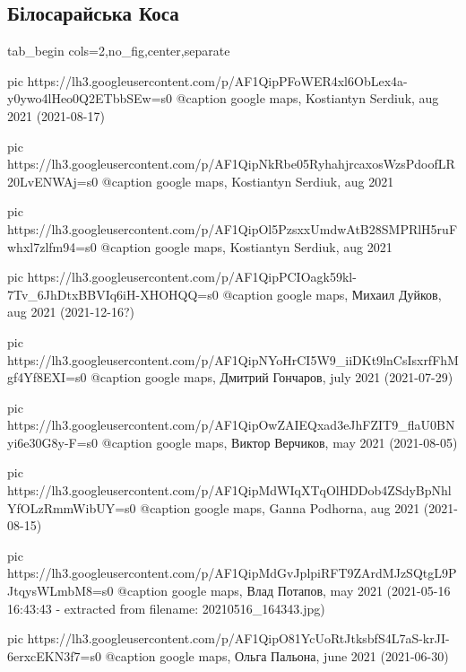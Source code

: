  
 
 
 
 

\subsection{Білосарайська Коса}


\ifcmt
  tab_begin cols=2,no_fig,center,separate

     pic https://lh3.googleusercontent.com/p/AF1QipPFoWER4xl6ObLex4a-y0ywo4lHeo0Q2ETbbSEw=s0
		 @caption google maps, Kostiantyn Serdiuk, aug 2021 (2021-08-17)

		 pic https://lh3.googleusercontent.com/p/AF1QipNkRbe05RyhahjrcaxosWzsPdoofLR20LvENWAj=s0
		 @caption google maps, Kostiantyn Serdiuk, aug 2021

		 pic https://lh3.googleusercontent.com/p/AF1QipOl5PzsxxUmdwAtB28SMPRlH5ruFwhxl7zlfm94=s0
		 @caption google maps, Kostiantyn Serdiuk, aug 2021

		 pic https://lh3.googleusercontent.com/p/AF1QipPCIOagk59kl-7Tv_6JhDtxBBVIq6iH-XHOHQQ=s0
		 @caption google maps, Михаил Дуйков, aug 2021 (2021-12-16?)

		 pic https://lh3.googleusercontent.com/p/AF1QipNYoHrCI5W9_iiDKt9lnCsIsxrfFhMgf4Yf8EXI=s0
		 @caption google maps, Дмитрий Гончаров, july 2021 (2021-07-29)

		 pic https://lh3.googleusercontent.com/p/AF1QipOwZAIEQxad3eJhFZIT9_flaU0BNyi6e30G8y-F=s0
		 @caption google maps, Виктор Верчиков, may 2021 (2021-08-05)

		 pic https://lh3.googleusercontent.com/p/AF1QipMdWIqXTqOlHDDob4ZSdyBpNhlYfOLzRmmWibUY=s0
		 @caption google maps, Ganna Podhorna, aug 2021 (2021-08-15)

		 pic https://lh3.googleusercontent.com/p/AF1QipMdGvJplpiRFT9ZArdMJzSQtgL9PJtqysWLmbM8=s0
		 @caption google maps, Влад Потапов, may 2021 (2021-05-16 16:43:43 - extracted from filename: 20210516_164343.jpg)

		 pic https://lh3.googleusercontent.com/p/AF1QipO81YcUoRtJtksbfS4L7aS-krJI-6erxcEKN3f7=s0
		 @caption google maps, Ольга Пальона, june 2021 (2021-06-30)

